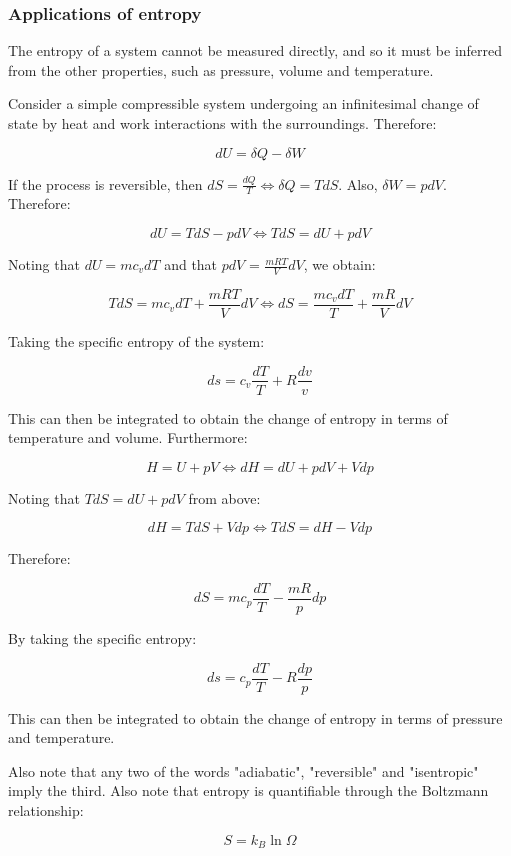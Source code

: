 \documentclass{article}
\begin{document}
\subsubsection{Applications of entropy}

The entropy of a system cannot be measured directly, and so it must be inferred from the other properties, such as pressure, volume and temperature. 

\begin{proposition}
    Consider a simple compressible system undergoing an infinitesimal change of state by heat and work interactions with the surroundings. Therefore:

    \[ dU = \delta Q - \delta W \]

    If the process is reversible, then $dS = \frac{dQ}{T} \iff \delta Q = TdS$. Also, $\delta W = pdV$. Therefore:

    \[ dU = TdS - pdV \iff TdS = dU + pdV \]

    Noting that $dU = mc_vdT$ and that $pdV$ = $\frac{mRT}{V}dV$, we obtain:

    \[ TdS = mc_vdT + \frac{mRT}{V}dV \iff dS = \frac{mc_vdT}{T} + \frac{mR}{V}dV\]

    Taking the specific entropy of the system:

    \[ ds = c_v \frac{dT}{T} + R \frac{dv}{v} \]

    This can then be integrated to obtain the change of entropy in terms of temperature and volume. Furthermore:

    \[ H = U + pV \iff dH = dU + pdV + Vdp \]

    Noting that $TdS = dU + pdV$ from above:

    \[ dH = TdS + Vdp \iff TdS = dH - Vdp \]

    Therefore:

    \[ dS = mc_p\frac{dT}{T} - \frac{mR}{p}dp \]

    By taking the specific entropy:

    \[ ds = c_p \frac{dT}{T} - R\frac{dp}{p} \]

    This can then be integrated to obtain the change of entropy in terms of pressure and temperature.
\end{proposition}

Also note that any two of the words "adiabatic", "reversible" and "isentropic" imply the third. Also note that entropy is quantifiable through the Boltzmann relationship:

\[ S = k_B \ln{\Omega} \]
\end{document}
